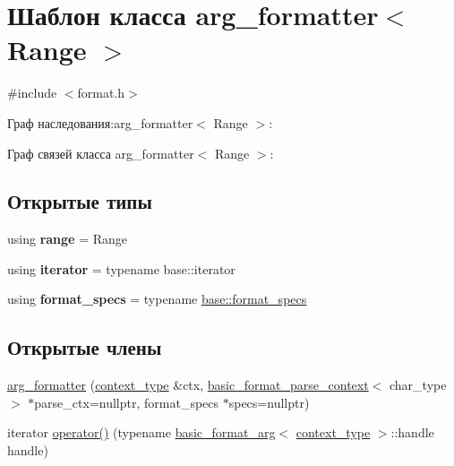 \hypertarget{classarg__formatter}{}\section{Шаблон класса arg\+\_\+formatter$<$ Range $>$}
\label{classarg__formatter}


{\ttfamily \#include $<$format.\+h$>$}



Граф наследования\+:arg\+\_\+formatter$<$ Range $>$\+:


Граф связей класса arg\+\_\+formatter$<$ Range $>$\+:
\subsection*{Открытые типы}
\begin{DoxyCompactItemize}
\item 
\mbox{\label{classarg__formatter_a2bcb25652305fe80defb8aba949153fc}} 
using {\bfseries range} = Range
\item 
\mbox{\label{classarg__formatter_af26ef28f7c6bdc61e7c99e5428557b9f}} 
using {\bfseries iterator} = typename base\+::iterator
\item 
\mbox{\label{classarg__formatter_a2caa42890a7bffa22304e8287eeeb0e6}} 
using {\bfseries format\+\_\+specs} = typename \hyperlink{structbasic__format__specs}{base\+::format\+\_\+specs}
\end{DoxyCompactItemize}
\subsection*{Открытые члены}
\begin{DoxyCompactItemize}
\item 
\hyperlink{classarg__formatter_ad30be490bff49291d06048448b004331}{arg\+\_\+formatter} (\hyperlink{classbasic__format__context}{context\+\_\+type} \&ctx, \hyperlink{classbasic__format__parse__context}{basic\+\_\+format\+\_\+parse\+\_\+context}$<$ char\+\_\+type $>$ $\ast$parse\+\_\+ctx=nullptr, format\+\_\+specs $\ast$specs=nullptr)
\item 
iterator \hyperlink{classarg__formatter_ac8ddd9b78934fc951916a30d46114ab1}{operator()} (typename \hyperlink{classbasic__format__arg}{basic\+\_\+format\+\_\+arg}$<$ \hyperlink{classbasic__format__context}{context\+\_\+type} $>$\+::handle handle)
\end{DoxyCompactItemize}
